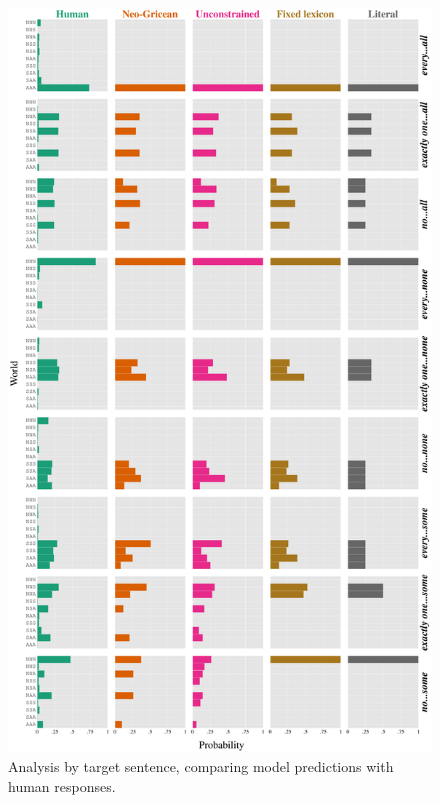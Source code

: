 \documentclass[leqno,12pt]{article}
\begin{document}
\begin{figure}[!t]
  \centering
  \includegraphics[height=0.92\textheight]{fig/allmodels}
  \caption{Analysis by target sentence, comparing model predictions
    with human responses.}
  \label{fig:exp-analysis}
\end{figure}
\end{document}
